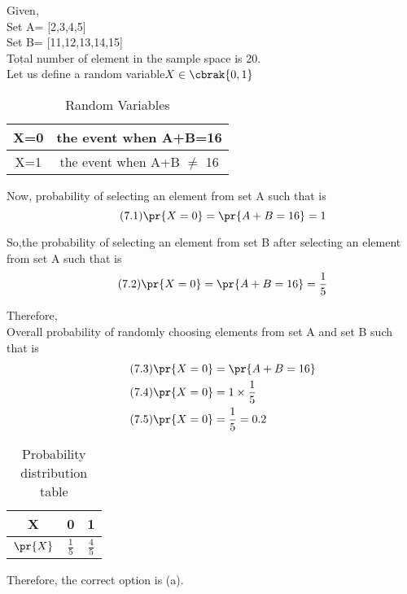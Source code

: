 Given,\\
Set A= [2,3,4,5]\\
Set B= [11,12,13,14,15]\\

Total number of element in the sample space is 20.\\

Let us define a random variable$ X \in \cbrak{0,1}$\\
\begin{table}[ht]
    \centering
    \begin{tabular}{|c|c|}
    \hline
    X=0 & the event when A+B=16\\
    \hline
    X=1 & the event when A+B $\neq$ 16\\
    \hline
    \end{tabular}
    \caption{Random Variables}
    \label{tab:Random Variables}
\end{table}

Now, probability of selecting an element from set A such that  is
\begin{equation}
   \tag{7.1}
    \pr{X=0}=\pr{A+B=16}=1
\end{equation}

So,the probability of selecting an element from set B after selecting an element from set A such that  is
\begin{equation}
    \tag{7.2}
    \pr{X=0}=\pr{A+B=16}= \frac{1}{5}
\end{equation}

Therefore,\\
Overall probability of randomly choosing elements from set A and set B such that is
\begin{align}
    \tag{7.3}
    \pr{X=0}&=\pr{A+B=16}\\
    \tag{7.4}
    \pr{X=0}&=1 \times \frac{1}{5}\\
    \tag{7.5}
    \pr{X=0}&= \frac{1}{5}=0.2
\end{align}


\begin{table}[ht]
    \centering
    \begin{tabular}{|c|c|c|}
    \hline
    X & 0 & 1\\
    \hline
    $\pr{X}$ & $\frac{1}{5}$ & $\frac{4}{5}$\\
    \hline
    \end{tabular}
    \caption{Probability distribution table}
    \label{tab:Probability distribution table}
\end{table}

Therefore, the correct option is (a).
